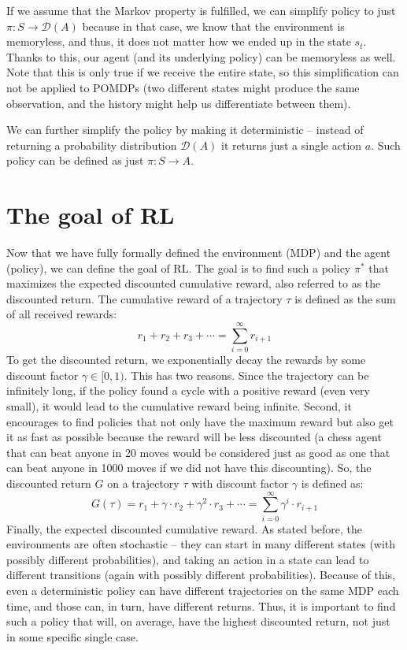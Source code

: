 \documentclass[
  digital,     %
  oneside,     %
  nosansbold,  %
  nocolorbold, %
  lof,         %
  lot,         %
]{fithesis4}
\begin{document}
If we assume that the Markov property is fulfilled, we can simplify policy to just $\pi\colon S \to \mathcal{D}(A)$ because in that case, we know that the environment is memoryless, and thus, it does not matter how we ended up in the state $s_t$. Thanks to this, our agent (and its underlying policy) can be memoryless as well. Note that this is only true if we receive the entire state, so this simplification can not be applied to POMDPs (two different states might produce the same observation, and the history might help us differentiate between them).

We can further simplify the policy by making it deterministic -- instead of returning a probability distribution $\mathcal{D}(A)$ it returns just a single action $a$. Such policy can be defined as just $\pi\colon S \to A$.

\section{The goal of RL}
\label{section:goal}
Now that we have fully formally defined the environment (MDP) and the agent (policy), we can define the goal of RL. The goal is to find such a policy $\pi^*$ that maximizes the expected discounted cumulative reward, also referred to as the discounted return. The cumulative reward of a trajectory $\tau$ is defined as the sum of all received rewards:
\[
r_1+r_2+r_3+\dotsb = \sum_{i=0}^{\infty} r_{i+1}
\]
To get the discounted return, we exponentially decay the rewards by some discount factor $\gamma \in [0,1)$. This has two reasons. Since the trajectory can be infinitely long, if the policy found a cycle with a positive reward (even very small), it would lead to the cumulative reward being infinite. Second, it encourages to find policies that not only have the maximum reward but also get it as fast as possible because the reward will be less discounted (a chess agent that can beat anyone in 20 moves would be considered just as good as one that can beat anyone in 1000 moves if we did not have this discounting). So, the discounted return $G$ on a trajectory $\tau$ with discount factor $\gamma$ is defined as:
\[
G(\tau)=r_1+\gamma \cdot r_2+ \gamma^2 \cdot r_3+\dotsb = \sum_{i=0}^{\infty} \gamma^i\cdot r_{i+1}
\]
Finally, the expected discounted cumulative reward. As stated before, the environments are often stochastic -- they can start in many different states (with possibly different probabilities), and taking an action in a state can lead to different transitions (again with possibly different probabilities). Because of this, even a deterministic policy can have different trajectories on the same MDP each time, and those can, in turn, have different returns. Thus, it is important to find such a policy that will, on average, have the highest discounted return, not just in some specific single case.
\end{document}
